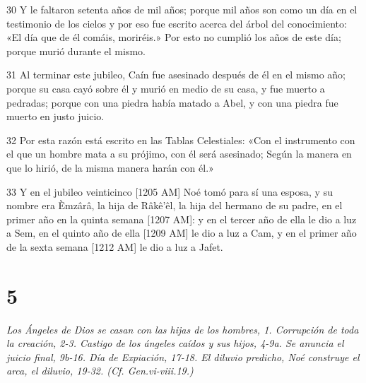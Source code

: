 \par 30 Y le faltaron setenta años de mil años; porque mil años son como un día en el testimonio de los cielos y por eso fue escrito acerca del árbol del conocimiento: «El día que de él comáis, moriréis.» Por esto no cumplió los años de este día; porque murió durante el mismo.
\par 31 Al terminar este jubileo, Caín fue asesinado después de él en el mismo año; porque su casa cayó sobre él y murió en medio de su casa, y fue muerto a pedradas; porque con una piedra había matado a Abel, y con una piedra fue muerto en justo juicio.
\par 32 Por esta razón está escrito en las Tablas Celestiales: «Con el instrumento con el que un hombre mata a su prójimo, con él será asesinado; Según la manera en que lo hirió, de la misma manera harán con él.»
\par 33 Y en el jubileo veinticinco [1205 AM] Noé tomó para sí una esposa, y su nombre era \`Emzârâ, la hija de Râkê'êl, la hija del hermano de su padre, en el primer año en la quinta semana [1207 AM]: y en el tercer año de ella le dio a luz a Sem, en el quinto año de ella [1209 AM] le dio a luz a Cam, y en el primer año de la sexta semana [1212 AM] le dio a luz a Jafet.

\chapter{5}

\par \textit{Los Ángeles de Dios se casan con las hijas de los hombres, 1. Corrupción de toda la creación, 2-3. Castigo de los ángeles caídos y sus hijos, 4-9a. Se anuncia el juicio final, 9b-16. Día de Expiación, 17-18. El diluvio predicho, Noé construye el arca, el diluvio, 19-32. (Cf. Gen.vi-viii.19.)}

